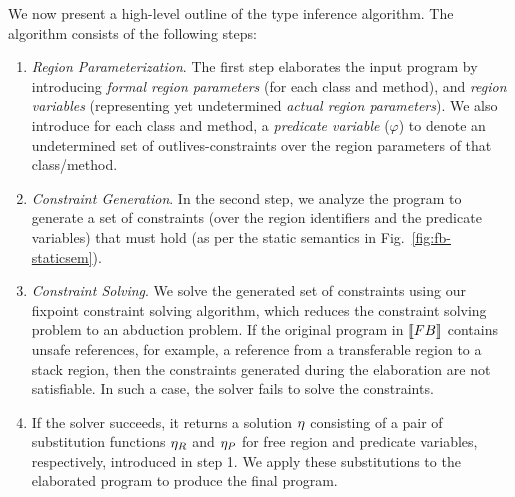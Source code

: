 %
We now present a high-level outline of the type inference algorithm.
The algorithm consists of the following steps:
\begin{enumerate}
 \item \emph{Region Parameterization}.
   The first step elaborates the input program by introducing \emph{formal region parameters}
   (for each class and method), and \emph{region variables} (representing yet undetermined
   \emph{actual region parameters}). We also introduce for each class and method, a
   \emph{predicate variable} ($\varphi$) to denote an undetermined set of outlives-constraints
   over the region parameters of that class/method.

 \item \emph{Constraint Generation}.
   In the second step, we analyze the program to generate a set of constraints
   (over the region identifiers and the predicate variables)
   that must hold (as per the static semantics in Fig.~\ref{fig:fb-staticsem}).

 \item \emph{Constraint Solving}.
   We solve the generated set of constraints using our fixpoint constraint
   solving algorithm, which reduces the constraint solving problem to
   an abduction problem. If the original program in $\llbracket {\sc FB} \rrbracket$ contains unsafe
   references, for example, a reference from a transferable region to a
   stack region, then the constraints generated during the elaboration
   are not satisfiable. In such a case, the solver fails to solve
   the constraints.

 \item If the solver succeeds, it returns a solution $\eta$ consisting of a
   pair of substitution functions $\eta_R$ and $\eta_P$ for
   free region and predicate variables, respectively, introduced in step 1.
   We apply these substitutions to the elaborated program to produce the final program.
\end{enumerate}

% 

